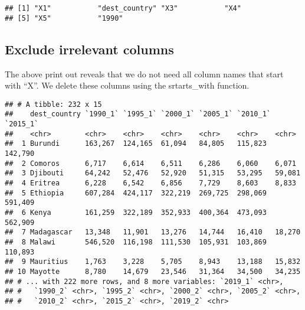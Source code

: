 \documentclass[]{article}
\newenvironment{Shaded}{\begin{snugshade}}{\end{snugshade}}
\newcommand{\KeywordTok}[1]{\textcolor[rgb]{0.13,0.29,0.53}{\textbf{#1}}}
\newcommand{\DecValTok}[1]{\textcolor[rgb]{0.00,0.00,0.81}{#1}}
\newcommand{\StringTok}[1]{\textcolor[rgb]{0.31,0.60,0.02}{#1}}
\newcommand{\OperatorTok}[1]{\textcolor[rgb]{0.81,0.36,0.00}{\textbf{#1}}}
\newcommand{\NormalTok}[1]{#1}
\begin{document}
\begin{verbatim}
## [1] "X1"           "dest_country" "X3"           "X4"          
## [5] "X5"           "1990"
\end{verbatim}

\subsection{Exclude irrelevant
columns}\label{exclude-irrelevant-columns}

The above print out reveals that we do not need all column names that
start with ``X''. We delete these columns using the srtarts\_with
function.

\begin{Shaded}
\end{Shaded}

\begin{verbatim}
## # A tibble: 232 x 15
##    dest_country `1990_1` `1995_1` `2000_1` `2005_1` `2010_1` `2015_1`
##    <chr>        <chr>    <chr>    <chr>    <chr>    <chr>    <chr>   
##  1 Burundi      163,267  124,165  61,094   84,805   115,823  142,790 
##  2 Comoros      6,717    6,614    6,511    6,286    6,060    6,071   
##  3 Djibouti     64,242   52,476   52,920   51,315   53,295   59,081  
##  4 Eritrea      6,228    6,542    6,856    7,729    8,603    8,833   
##  5 Ethiopia     607,284  424,117  322,219  269,725  298,069  591,409 
##  6 Kenya        161,259  322,189  352,933  400,364  473,093  562,909 
##  7 Madagascar   13,348   11,901   13,276   14,744   16,410   18,270  
##  8 Malawi       546,520  116,198  111,530  105,931  103,869  110,893 
##  9 Mauritius    1,763    3,228    5,705    8,943    13,188   15,832  
## 10 Mayotte      8,780    14,679   23,546   31,364   34,500   34,235  
## # ... with 222 more rows, and 8 more variables: `2019_1` <chr>,
## #   `1990_2` <chr>, `1995_2` <chr>, `2000_2` <chr>, `2005_2` <chr>,
## #   `2010_2` <chr>, `2015_2` <chr>, `2019_2` <chr>
\end{verbatim}
\end{document}
